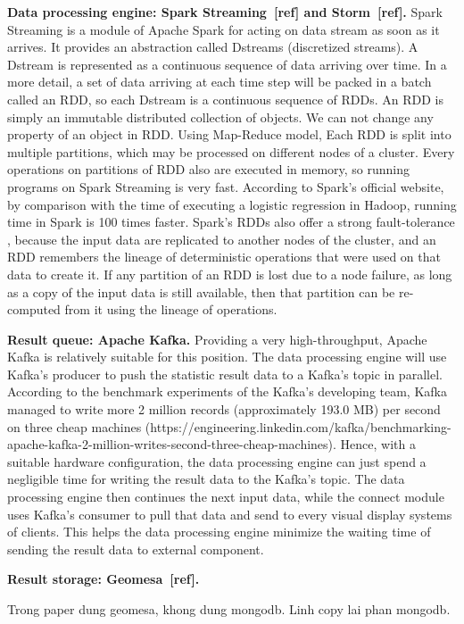 \documentclass{acm_proc_article-sp}
\begin{document}
\textbf{Data processing engine: Spark Streaming~[ref] and Storm~[ref].} Spark Streaming is a module of Apache Spark for acting on data stream as soon as it arrives. It provides an abstraction called Dstreams (discretized streams). A Dstream is represented as a continuous sequence of data arriving over time. In a more detail, a set of data arriving at each time step will be packed in a batch called an RDD, so each Dstream is a continuous sequence of RDDs. An RDD is simply an immutable distributed collection of objects. We can not change any property of an object in RDD. Using Map-Reduce model, Each RDD is split into multiple partitions, which may be processed on different nodes of a cluster. Every operations on partitions of RDD also are executed in memory, so running programs on Spark Streaming is very fast. According to Spark's official website, by comparison with the time of executing a logistic regression in Hadoop, running time in Spark is 100 times faster.
Spark's RDDs also offer a strong fault-tolerance , because the input data are replicated to another nodes of the cluster, and an RDD remembers the lineage of deterministic operations that were used on that data to create it. If any partition of an RDD is lost due to a node failure, as long as a copy of the input data is still available, then that partition can be re-computed from it using the lineage of operations.

\textbf{Result queue: Apache Kafka.} Providing a very high-throughput, Apache Kafka is relatively suitable for this position. The data processing engine will use Kafka's producer to push the statistic result data to a Kafka's topic in parallel. According to the benchmark experiments of the Kafka's developing team,  Kafka managed to write more 2 million records (approximately 193.0 MB)  per second on three cheap machines (https://engineering.linkedin.com/kafka/benchmarking-apache-kafka-2-million-writes-second-three-cheap-machines). Hence, with a suitable hardware configuration, the data processing engine can just spend a negligible time for writing the result data to the Kafka's topic. The data processing engine then continues the next input data, while the connect module uses Kafka's consumer to pull that data and send to every visual display systems of clients. This helps the data processing engine minimize the waiting time of sending the result data to external component.

\textbf{Result storage: Geomesa~[ref].} 

Trong paper dung geomesa, khong dung mongodb. Linh copy lai phan mongodb. 
\end{document}
